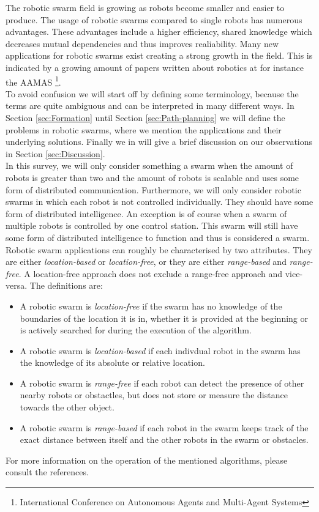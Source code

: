 The robotic swarm field is growing as robots become smaller and easier to produce.
The usage of robotic swarms compared to single robots has numerous advantages. 
These advantages include a higher efficiency, shared knowledge which decreases mutual dependencies and thus improves realiability.
Many new applications for robotic swarms exist creating a strong growth in the field.
This is indicated by a growing amount of papers written about robotics at for instance the AAMAS \footnote{International Conference on Autonomous Agents and Multi-Agent Systems}.\cite{Amigoni2014}\\

To avoid confusion we will start off by defining some terminology, because the terms are quite ambiguous and can be interpreted in many different ways.
In Section \ref{sec:Formation} until Section \ref{sec:Path-planning} we will define the problems in robotic swarms, where we mention the applications and their underlying solutions.
Finally we in will give a brief discussion on our observations in Section \ref{sec:Discussion}.\\

In this survey, we will only consider something a swarm when the amount of robots is greater than two and the amount of robots is scalable and uses some form of distributed communication.
Furthermore, we will only consider robotic swarms in which each robot is not controlled individually.
They should have some form of distributed intelligence.
An exception is of course when a swarm of multiple robots is controlled by one control station.
This swarm will still have some form of distributed intelligence to function and thus is considered a swarm.  \\

Robotic swarm applications can roughly be characterised by two attributes. They are either \emph{location-based} or \emph{location-free}, or they are either \emph{range-based} and  \emph{range-free}.
A location-free approach does not exclude a range-free approach and vice-versa. 
The definitions are:

  \begin{itemize}
    \item A robotic swarm is \emph{location-free} if the swarm has no knowledge of the boundaries of the location it is in, whether it is provided at the beginning or is actively searched for during the execution of the algorithm. 
    \item A robotic swarm is \emph{location-based} if each indivdual robot in the swarm has the knowledge of its absolute or relative location.
    \item A robotic swarm is \emph{range-free} if each robot can detect the presence of other nearby robots or obstactles, but does not store or measure the distance towards the other object.
    \item A robotic swarm is \emph{range-based} if each robot in the swarm keeps track of the exact distance between itself and the other robots in the swarm or obstacles. 
  \end{itemize}


For more information on the operation of the mentioned algorithms, please consult the references. 

  

